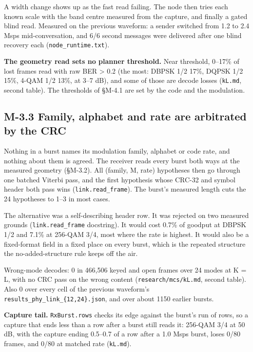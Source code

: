 \documentclass[10pt,letterpaper,twocolumn]{article}
\begin{document}
A width change shows up as the fast read failing. The node then tries each known scale with the band centre measured from the capture, and finally a gated blind read. Measured on the previous waveform: a sender switched from 1.2 to 2.4 Msps mid-conversation, and 6/6 second messages were delivered after one blind recovery each (\texttt{node\_\allowbreak{}runtime.\allowbreak{}txt}).

\textbf{The geometry read sets no planner threshold.} Near threshold, 0--17\% of lost frames read with raw BER \textgreater{} 0.2 (the most: DBPSK 1/2 17\%, DQPSK 1/2 15\%, 4-QAM 1/2 13\%, at 3--7 dB), and some of those are decode losses (\texttt{kL.\allowbreak{}md}, second table). The thresholds of §M-4.1 are set by the code and the modulation.

\subsection{M-3.3 Family, alphabet and rate are arbitrated by the CRC}\label{m-33-family-alphabet-and-rate-are-arbitrated-by-the-crc}

Nothing in a burst names its modulation family, alphabet or code rate, and nothing about them is agreed. The receiver reads every burst both ways at the measured geometry (§M-3.2). All (family, M, rate) hypotheses then go through one batched Viterbi pass, and the first hypothesis whose CRC-32 and symbol header both pass wins (\texttt{link.\allowbreak{}read\_\allowbreak{}frame}). The burst's measured length cuts the 24 hypotheses to 1--3 in most cases.

The alternative was a self-describing header row. It was rejected on two measured grounds (\texttt{link.\allowbreak{}read\_\allowbreak{}frame} docstring). It would cost 0.7\% of goodput at DBPSK 1/2 and 7.1\% at 256-QAM 3/4, most where the rate is highest. It would also be a fixed-format field in a fixed place on every burst, which is the repeated structure the no-added-structure rule keeps off the air.

Wrong-mode decodes: 0 in 466,506 keyed and open frames over 24 modes at K = L, with no CRC pass on the wrong content (\texttt{research/\allowbreak{}mcs/\allowbreak{}kL.\allowbreak{}md}, second table). Also 0 over every cell of the previous waveform's \texttt{results\_\allowbreak{}phy\_\allowbreak{}link\_\allowbreak{}\{12,\allowbreak{}24\}.\allowbreak{}json}, and over about 1150 earlier bursts.

\textbf{Capture tail.} \texttt{RxBurst.\allowbreak{}rows} checks its edge against the burst's run of rows, so a capture that ends less than a row after a burst still reads it: 256-QAM 3/4 at 50 dB, with the capture ending 0.5--0.7 of a row after a 1.0 Msps burst, loses 0/80 frames, and 0/80 at matched rate (\texttt{kL.\allowbreak{}md}).
\end{document}

